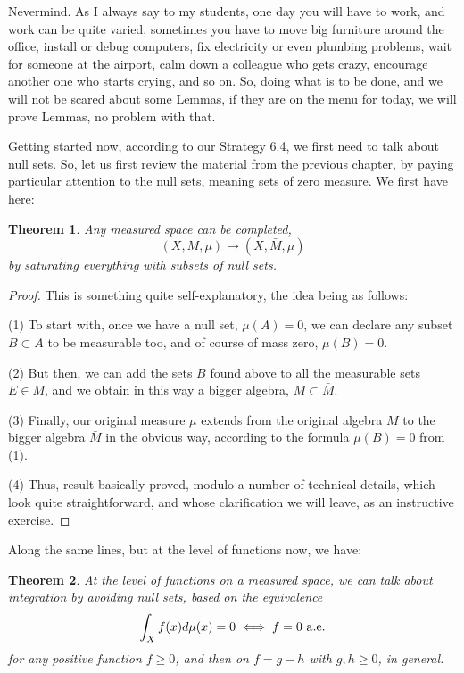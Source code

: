 \documentclass[12pt]{amsbook}
\newtheorem{theorem}{Theorem}[chapter]
\begin{document}
\bigskip

Nevermind. As I always say to my students, one day you will have to work, and work can be quite varied, sometimes you have to move big furniture around the office, install or debug computers, fix electricity or even plumbing problems, wait for someone at the airport, calm down a colleague who gets crazy, encourage another one who starts crying, and so on. So, doing what is to be done, and we will not be scared about some Lemmas, if they are on the menu for today, we will prove Lemmas, no problem with that.

\bigskip

Getting started now, according to our Strategy 6.4, we first need to talk about null sets. So, let us first review the material from the previous chapter, by paying particular attention to the null sets, meaning sets of zero measure. We first have here:

\begin{theorem}
Any measured space can be completed,
$$(X,M,\mu)\to(X,\bar{M},\mu)$$
by saturating everything with subsets of null sets.
\end{theorem}

\begin{proof}
This is something quite self-explanatory, the idea being as follows:

\medskip

(1) To start with, once we have a null set, $\mu(A)=0$, we can declare any subset $B\subset A$ to be measurable too, and of course of mass zero, $\mu(B)=0$.

\medskip

(2) But then, we can add the sets $B$ found above to all the measurable sets $E\in M$, and we obtain in this way a bigger algebra, $M\subset\bar{M}$.

\medskip

(3) Finally, our original measure $\mu$ extends from the original algebra $M$ to the bigger algebra $\bar{M}$ in the obvious way, according to the formula $\mu(B)=0$ from (1). 

\medskip

(4) Thus, result basically proved, modulo a number of technical details, which look quite straightforward, and whose clarification we will leave, as an instructive exercise.
\end{proof}

Along the same lines, but at the level of functions now, we have:

\begin{theorem}
At the level of functions on a measured space, we can talk about integration by avoiding null sets, based on the equivalence
$$\int_Xf(x)d\mu(x)=0\iff f=0\ {\rm a.e.}$$
for any positive function $f\geq0$, and then on $f=g-h$ with $g,h\geq0$, in general.
\end{theorem}
\end{document}
